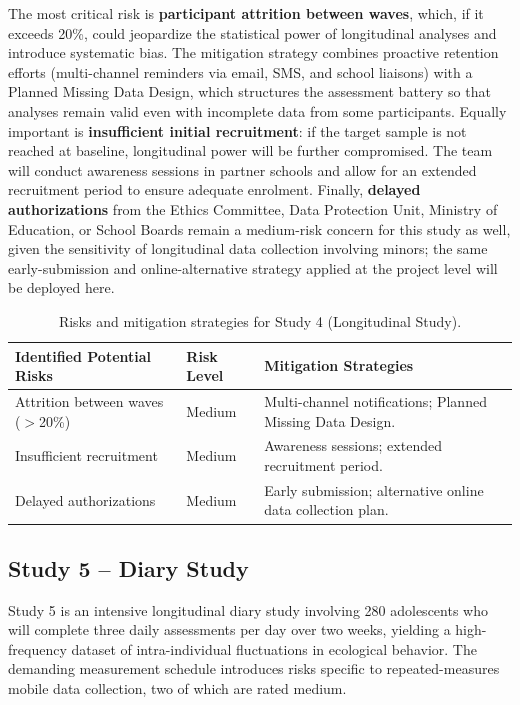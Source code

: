 The most critical risk is \textbf{participant attrition between waves}, which, if it exceeds 20\%, could jeopardize the statistical power of longitudinal analyses and introduce systematic bias. The mitigation strategy combines proactive retention efforts (multi-channel reminders via email, SMS, and school liaisons) with a Planned Missing Data Design, which structures the assessment battery so that analyses remain valid even with incomplete data from some participants. Equally important is \textbf{insufficient initial recruitment}: if the target sample is not reached at baseline, longitudinal power will be further compromised. The team will conduct awareness sessions in partner schools and allow for an extended recruitment period to ensure adequate enrolment. Finally, \textbf{delayed authorizations} from the Ethics Committee, Data Protection Unit, Ministry of Education, or School Boards remain a medium-risk concern for this study as well, given the sensitivity of longitudinal data collection involving minors; the same early-submission and online-alternative strategy applied at the project level will be deployed here.

\vspace{0.5cm}

\begin{table}[h!]
\centering
\caption{Risks and mitigation strategies for Study 4 (Longitudinal Study).}
\begin{tabular}{|P{5.2cm}|P{2.0cm}|P{7.1cm}|}
\hline
{}
\textbf{Identified Potential Risks} & \textbf{Risk Level} & \textbf{Mitigation Strategies} \\
\hline
Attrition between waves ($>$20\%)
  & Medium
  & Multi-channel notifications; Planned Missing Data Design. \\
\hline
Insufficient recruitment
  & Medium
  & Awareness sessions; extended recruitment period. \\
\hline
Delayed authorizations
  & Medium
  & Early submission; alternative online data collection plan. \\
\hline
\end{tabular}
\end{table}

\subsection*{Study 5 -- Diary Study}

Study 5 is an intensive longitudinal diary study involving 280 adolescents who will complete three daily assessments per day over two weeks, yielding a high-frequency dataset of intra-individual fluctuations in ecological behavior. The demanding measurement schedule introduces risks specific to repeated-measures mobile data collection, two of which are rated medium.

